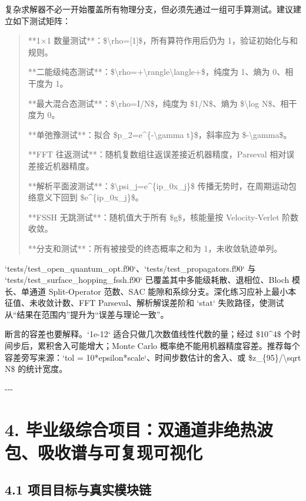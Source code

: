 \documentclass[UTF8,openany,11pt,fontset=fandol]{ctexbook}
\begin{document}
复杂求解器不必一开始覆盖所有物理分支，但必须先通过一组可手算测试。建议建立如下测试矩阵：

\begin{quote}
**1×1 数量测试**：\$\textbackslash rho={[}1{]}\$，所有算符作用后仍为
1，验证初始化与和规则。

**二能级纯态测试**：\$\textbackslash rho=\textbar+\textbackslash rangle\textbackslash langle+\textbar\$，纯度为
1、熵为 0、相干度为 1。

**最大混合态测试**：\$\textbackslash rho=I/N\$，纯度为 \$1/N\$、熵为
\$\textbackslash log N\$、相干度为 0。

**单弛豫测试**：拟合 \$p\_2=e\^{}\{-\textbackslash gamma t\}\$，斜率应为
\$-\textbackslash gamma\$。

**FFT 往返测试**：随机复数组往返误差接近机器精度，Parseval
相对误差接近机器精度。

**解析平面波测试**：\$\textbackslash psi\_j=e\^{}\{ip\_0x\_j\}\$
传播无势时，在周期运动包络意义下回到 \$e\^{}\{ip\_0x\_j\}\$。

**FSSH 无跳测试**：随机值大于所有 \$g\$，核能量按 Velocity-Verlet
阶数收敛。

**分支和测试**：所有被接受的终态概率之和为 1，未收敛轨迹单列。
\end{quote}

`tests/test\_open\_quantum\_opt.f90`、`tests/test\_propagators.f90` 与
`tests/test\_surface\_hopping\_fssh.f90`
已覆盖其中多能级耗散、退相位、Bloch 模长、单通道 Split-Operator
范数、SAC 能隙和系综分支。深化练习应补上最小本征值、未收敛计数、FFT
Parseval、解析解误差阶和 `stat`
失败路径，使测试从``结果在范围内''提升为``误差与理论一致''。

断言的容差也要解释。`1e-12` 适合只做几次数值线性代数的量；经过
\$10\^{}4\$ 个时间步后，累积舍入可能增大；Monte Carlo
概率绝不能用机器精度容差。推荐每个容差旁写来源：`tol =
10*epsilon*scale`、时间步数估计的舍入、或
\$z\_\{95\}/\textbackslash sqrt N\$ 的统计宽度。

-\/-\/-

\section{\texorpdfstring{\textbf{4.
毕业级综合项目：双通道非绝热波包、吸收谱与可复现可视化}}{4. 毕业级综合项目：双通道非绝热波包、吸收谱与可复现可视化}}\label{ux6bd5ux4e1aux7ea7ux7efcux5408ux9879ux76eeux53ccux901aux9053ux975eux7eddux70edux6ce2ux5305ux5438ux6536ux8c31ux4e0eux53efux590dux73b0ux53efux89c6ux5316}

\subsection{\texorpdfstring{\textbf{4.1
项目目标与真实模块链}}{4.1 项目目标与真实模块链}}\label{ux9879ux76eeux76eeux6807ux4e0eux771fux5b9eux6a21ux5757ux94fe}
\end{document}

